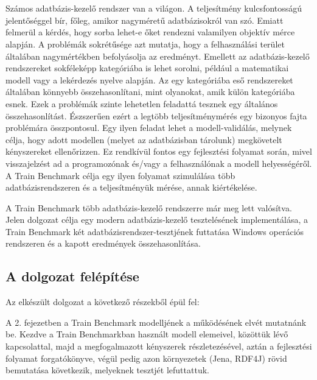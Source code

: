 \chapter{\bevezetes}

Számos adatbázis-kezelő rendszer van a világon. A teljesítmény kulcsfontosságú jelentőséggel bír, főleg, amikor nagyméretű adatbázisokról van szó. Emiatt felmerül a kérdés, hogy sorba lehet-e őket rendezni valamilyen objektív mérce alapján. A problémák sokrétűsége azt mutatja, hogy a felhasználási terület általában nagymértékben befolyásolja az eredményt. Emellett az adatbázis-kezelő rendszereket sokféleképp kategóriába is lehet sorolni, például a matematikai modell vagy a lekérdezés nyelve alapján. Az egy kategóriába eső rendszereket általában könnyebb összehasonlítani, mint olyanokat, amik külön kategóriába esnek. Ezek a problémák szinte lehetetlen feladattá tesznek egy általános összehasonlítást. Észszerűen ezért a legtöbb teljesítménymérés egy bizonyos fajta problémára összpontosul. Egy ilyen feladat lehet a modell-validálás, melynek célja, hogy adott modellen (melyet az adatbázisban tárolunk) megkövetelt kényszereket ellenőrizzen. Ez rendkívül fontos egy fejlesztési folyamat során, mivel visszajelzést ad a programozónak és/vagy a felhasználónak a modell helyességéről. A Train Benchmark célja egy ilyen folyamat szimulálása több adatbázisrendszeren és a teljesítményük mérése, annak kiértékelése.

A Train Benchmark több adatbázis-kezelő rendszerre már meg lett valósítva. Jelen dolgozat célja egy modern adatbázis-kezelő tesztelésének implementálása, a Train Benchmark két adatbázisrendszer-tesztjének futtatása Windows operációs rendszeren és a kapott eredmények összehasonlítása.

\section{A dolgozat felépítése}

Az elkészült dolgozat a következő részekből épül fel:

A 2. fejezetben a Train Benchmark modelljének a működésének elvét mutatnánk be. Kezdve a Train Benchmarkban használt modell elemeivel, közöttük lévő kapcsolattal, majd a megfogalmazott kényszerek részletezésével, aztán a fejlesztési folyamat forgatókönyve, végül pedig azon környezetek (Jena, RDF4J) rövid bemutatása következik, melyeknek tesztjét lefuttattuk.

